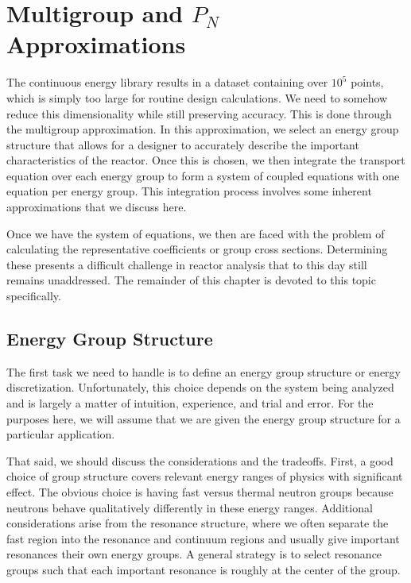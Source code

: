 \section{Multigroup and $P_N$ Approximations}

The continuous energy library results in a dataset containing over $10^5$ points, which is simply too large for routine design calculations. We need to somehow reduce this dimensionality while still preserving accuracy. This is done through the multigroup approximation. In this approximation, we select an energy group structure that allows for a designer to accurately describe the important characteristics of the reactor. Once this is chosen, we then integrate the transport equation over each energy group to form a system of coupled equations with one equation per energy group. This integration process involves some inherent approximations that we discuss here.

Once we have the system of equations, we then are faced with the problem of calculating the representative coefficients or group cross sections. Determining these presents a difficult challenge in reactor analysis that to this day still remains unaddressed. The remainder of this chapter is devoted to this topic specifically.

\subsection{Energy Group Structure}

The first task we need to handle is to define an energy group structure or energy discretization. Unfortunately, this choice depends on the system being analyzed and is largely a matter of intuition, experience, and trial and error. For the purposes here, we will assume that we are given the energy group structure for a particular application. 

That said, we should discuss the considerations and the tradeoffs. First, a good choice of group structure covers relevant energy ranges of physics with significant effect. The obvious choice is having fast versus thermal neutron groups because neutrons behave qualitatively differently in these energy ranges. Additional considerations arise from the resonance structure, where we often separate the fast region into the resonance and continuum regions and usually give important resonances their own energy groups. A general strategy is to select resonance groups such that each important resonance is roughly at the center of the group. 

